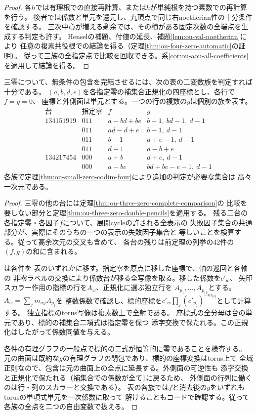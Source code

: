 \begin{proof}
各$h$では有理根での直接再計算、または$h$が単純根を持つ素数での再計算を行う。
後者では係数と単元を還元し、九頂点で同じ右noetherian性の十分条件を確認する。
三次中心が増える剰余では、その積がある固定次数の全端点を生成する判定も許す。
Henselの補題、付値の延長、補題\ref{lem:ou-val-noetherian}により
任意の複素共役根での結論を得る（定理\ref{thm:ou-four-zero-automatic}の証明）。
従って三族の全指定点で比較を回収できる。系\ref{cor:ou-aou-all-coefficients}
を適用して結論を得る。
\end{proof}

\begin{proposition}[残る二つの三零台の十二族による被覆]
\label{prop:ou-three-zero-twelve-surfaces}
三零について、無条件の包含を完結させるには、次の表の二変数族を判定すれば十分である。
$(a,b,d,e)$を各指定零の補集合正規化の四座標とし、各行で$f=g=0$、
座標と外側面は単元とする。一つの行の複数の$g$は個別の族を表す。
\[
\begin{array}{c|c|l|l}
\text{台}&\text{指定零}& f &g\\\hline
134151919&011&a-bd+be& b-1,\ bd-1,\ d-1\\
 &011&ad-d+e& b-1,\ d-1\\
 &011&b-1&a+e-1,\ d-1\\
 &011&d-1&a-b+e\\\hline
134217454&000&a+b&d+e,\ d-1\\
 &000&a-be&bd+be-e-1,\ d-1
\end{array}
\]
各族で定理\ref{thm:ou-small-zero-codim-four}により追加の判定が必要な集合は
高々一次元である。
\end{proposition}
\begin{proof}
三零の他の台には定理\ref{thm:ou-three-zero-complete-comparison}の
比較を要しない部分と定理\ref{thm:ou-three-zero-double-pencils}を適用する。
残る二台の各指定零・各因子$f$について、展開cycleの許される全表示の
失敗因子集合の共通部分が、実際にそのうちの一つの表示の失敗因子集合と
等しいことを検算する。従って高余次元の交叉も含めて、
各台の残りは前定理の列挙の42件の$(f,g)$の和に含まれる。

は各件を
表のいずれかに移す。指定零を原点に移した座標で、軸の巡回と各軸の
非零ラベルの交換により係数台が移る全写像を取る。移した係数を$c'_w$、
矢印スカラー作用の指標の行を$A_w$、正規化に選ぶ独立行を
$A_{p_1},\ldots,A_{p_{19}}$とする。$A_w=\sum_j m_{wj}A_{p_j}$を
整数係数で確認し、標的座標を$c'_w\prod_j(c'_{p_j})^{-m_{wj}}$として計算する。
独立指標のtorus写像は複素数上で全射である。
座標式の全分母は台の単元であり、標的の補集合二項式は指定零を保つ
添字交換で保たれる。この正規化はしたがって係数同値を与える。

各件の有理グラフの一般点で標的の二式が恒等的に零であることを検査する。
元の曲面は既約な$g$の有理グラフの閉包であり、標的の座標変換はtorus上で
全域正則なので、包含は元の曲面上の全点に延長する。外側面の可逆性も
添字交換と正規化で保たれる（補集合での係数が全て1に戻るため、
外側面の行列に働くのは行・列のスカラーと交換である）。
表の各族では$f$と消去後の$g$をいずれもtorusの単項式単元を一次係数に取って
解けることもコードで確認する。従って各族の全点を二つの自由変数で扱える。
\end{proof}

